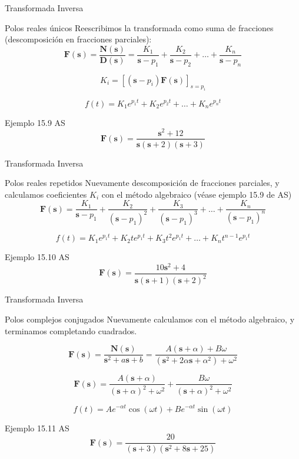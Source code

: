 \documentclass[xcolor={usenames,svgnames,dvipsnames}]{beamer}
\newcommand{\laplace}[1]{\mathbf{#1}(\mathbf{s})}
\newcommand{\slp}{\mathbf{s}}
\begin{document}
\begin{frame}[label={sec:org2d9da01}]{Transformada Inversa}
\begin{block}{Polos reales únicos}
Reescribimos la transformada como suma de fracciones (descomposición en fracciones parciales):
\[
  \laplace{F} = \frac{\laplace{N}}{\laplace{D}} = \frac{K_1}{\slp-p_1} + \frac{K_2}{\slp-p_2} + \ldots + \frac{K_n}{\slp-p_n} 
\]

\[
  K_i = \left[(\slp - p_i) \laplace{F}\right]_{s = p_i}
\]

\[
  f(t) = K_1 e^{p_1 t} + K_2 e^{p_2 t} + \ldots + K_n e^{p_n t}
\]
\end{block}

\begin{block}{Ejemplo 15.9 AS}
\[
  \laplace{F} = \frac{\slp^2 + 12}{\slp(\slp + 2)(\slp + 3)}
\]
\end{block}
\end{frame}


\begin{frame}[label={sec:org0eafa9e}]{Transformada Inversa}
\begin{block}{Polos reales repetidos}
Nuevamente descomposición de fracciones parciales, y calculamos coeficientes \(K_i\) con el método algebraico (véase ejemplo 15.9 de AS)
\[
  \laplace{F} = \frac{K_1}{\slp-p_1} + \frac{K_2}{(\slp-p_1)^2} + \frac{K_3}{(\slp-p_1)^3} + \ldots + \frac{K_n}{(\slp-p_1)^n} 
\]

\[
  f(t) = K_1 e^{p_1 t} + K_2 t e^{p_1 t} + K_3 t^2 e^{p_1 t} + \ldots + K_n t^{n-1} e^{p_1 t}
\]
\end{block}



\begin{block}{Ejemplo 15.10 AS}
\[
  \laplace{F} = \frac{10\slp^2 + 4}{\slp(\slp + 1)(\slp + 2)^2}
\]
\end{block}
\end{frame}


\begin{frame}[label={sec:org3352c82}]{Transformada Inversa}
\begin{block}{Polos complejos conjugados}
Nuevamente calculamos con el método algebraico, y terminamos \guillemotleft{}completando cuadrados\guillemotright{}.

\[
  \laplace{F} = \frac{\laplace{N}}{\slp^2 + a \slp + b} = \frac{A (\slp + \alpha) + B \omega}{(\slp^2 + 2\alpha \slp + \alpha^2) + \omega^2}
\]

\[
  \laplace{F} = \frac{A (\slp + \alpha)}{(\slp + \alpha)^2 + \omega^2} + \frac{B \omega}{(\slp + \alpha)^2 + \omega^2}
\]

\[
  f(t) = A e^{- \alpha t} \cos(\omega t) + B e^{- \alpha t} \sin(\omega t)
\]
\end{block}


\begin{block}{Ejemplo 15.11 AS}
\[
  \laplace{F} = \frac{20}{(\slp + 3)(\slp^2 + 8 \slp + 25)}
\]
\end{block}
\end{frame}
\end{document}
